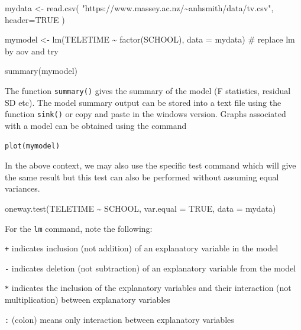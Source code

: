 \documentclass[
  letterpaper,
  DIV=11,
  numbers=noendperiod]{scrreprt}
\newenvironment{Shaded}{\begin{snugshade}}{\end{snugshade}}
\newcommand{\AttributeTok}[1]{\textcolor[rgb]{0.40,0.45,0.13}{#1}}
\newcommand{\CommentTok}[1]{\textcolor[rgb]{0.37,0.37,0.37}{#1}}
\newcommand{\ConstantTok}[1]{\textcolor[rgb]{0.56,0.35,0.01}{#1}}
\newcommand{\FunctionTok}[1]{\textcolor[rgb]{0.28,0.35,0.67}{#1}}
\newcommand{\NormalTok}[1]{\textcolor[rgb]{0.00,0.23,0.31}{#1}}
\newcommand{\OtherTok}[1]{\textcolor[rgb]{0.00,0.23,0.31}{#1}}
\newcommand{\SpecialCharTok}[1]{\textcolor[rgb]{0.37,0.37,0.37}{#1}}
\newcommand{\StringTok}[1]{\textcolor[rgb]{0.13,0.47,0.30}{#1}}
\begin{document}
\begin{Shaded}
\begin{Highlighting}[]
\NormalTok{mydata }\OtherTok{\textless{}{-}} \FunctionTok{read.csv}\NormalTok{(}
  \StringTok{"https://www.massey.ac.nz/\textasciitilde{}anhsmith/data/tv.csv"}\NormalTok{, }
  \AttributeTok{header=}\ConstantTok{TRUE}
\NormalTok{  )}

\NormalTok{mymodel }\OtherTok{\textless{}{-}} \FunctionTok{lm}\NormalTok{(TELETIME }\SpecialCharTok{\textasciitilde{}} \FunctionTok{factor}\NormalTok{(SCHOOL), }
              \AttributeTok{data =}\NormalTok{ mydata) }\CommentTok{\# replace lm by aov and try}

\FunctionTok{summary}\NormalTok{(mymodel)}
\end{Highlighting}
\end{Shaded}

The function \texttt{summary()} gives the summary of the model (F
statistics, residual SD etc). The model summary output can be stored
into a text file using the function \texttt{sink()} or copy and paste in
the windows version. Graphs associated with a model can be obtained
using the command

\texttt{plot(mymodel)}

In the above context, we may also use the specific test command which
will give the same result but this test can also be performed without
assuming equal variances.

\begin{Shaded}
\begin{Highlighting}[]
\FunctionTok{oneway.test}\NormalTok{(TELETIME }\SpecialCharTok{\textasciitilde{}}\NormalTok{ SCHOOL, }
            \AttributeTok{var.equal =} \ConstantTok{TRUE}\NormalTok{, }
            \AttributeTok{data =}\NormalTok{ mydata) }
\end{Highlighting}
\end{Shaded}

For the \texttt{lm} command, note the following:

\texttt{+} indicates inclusion (not addition) of an explanatory variable
in the model

\texttt{-} indicates deletion (not subtraction) of an explanatory
variable from the model

\texttt{*} indicates the inclusion of the explanatory variables and
their interaction (not multiplication) between explanatory variables

\texttt{:} (colon) means only interaction between explanatory variables
\end{document}
